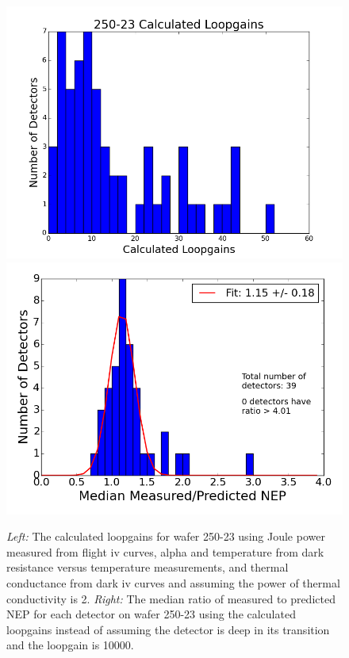 \documentclass[../EBEXPaper2.tex]{subfiles}
\begin{document}


\begin{figure}[ht!]
\begin{center}
\includegraphics[width=0.4\columnwidth]{images/250-23_calculated_loopgains_histogram.png}
\includegraphics[width=0.4\columnwidth]{images/250-23_meas_pred_ratios_obsc_calculated_loopgain.png}
\caption{{\it Left:} The calculated loopgains for wafer 250-23 using Joule power measured from flight iv curves, alpha and temperature from dark resistance versus temperature measurements, and thermal conductance from dark iv curves and assuming the power of thermal conductivity is 2. {\it Right:} The median ratio of measured to predicted \ac{NEP} for each detector on wafer 250-23 using the calculated loopgains instead of assuming the detector is deep in its transition and the loopgain is 10000.}
\label{fig:loopgain_histogram}
\end{center}
\end{figure}
\end{document}
